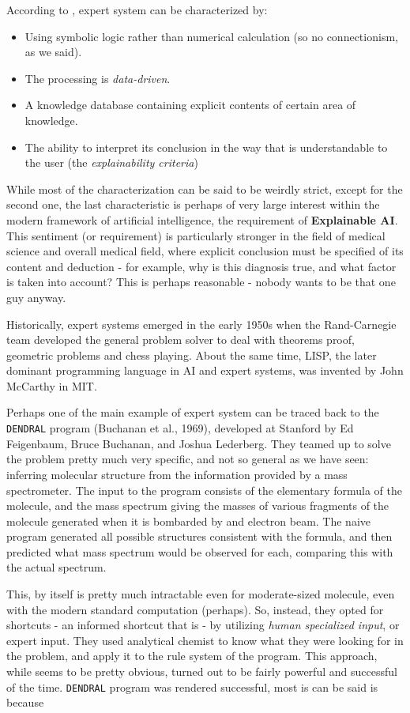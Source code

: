 According to \cite{articleMetaxiotis}, expert system can be characterized by: 
\begin{itemize}[itemsep=1pt,topsep=1pt]
    \item Using symbolic logic rather than numerical calculation (so no connectionism, as we said). 
    \item The processing is \textit{data-driven}. 
    \item A knowledge database containing explicit contents of certain area of knowledge. 
    \item The ability to interpret its conclusion in the way that is understandable to the user (the \textit{explainability criteria})
\end{itemize}
While most of the characterization can be said to be weirdly strict, except for the second one, the last characteristic is perhaps of very large interest within the modern framework of artificial intelligence, the requirement of \textbf{Explainable AI}. This sentiment (or requirement) is particularly stronger in the field of medical science and overall medical field, where explicit conclusion must be specified of its content and deduction - for example, why is this diagnosis true, and what factor is taken into account? This is perhaps reasonable - nobody wants to be that one guy anyway. 

Historically, expert systems emerged in the early 1950s when the Rand-Carnegie team developed the general problem solver to deal with theorems proof, geometric problems and chess playing. About the same time, LISP, the later dominant programming language in AI and expert systems, was invented by John McCarthy in MIT. 

Perhaps one of the main example of expert system can be traced back to the \texttt{DENDRAL} program (Buchanan et al., 1969), developed at Stanford by Ed Feigenbaum, Bruce Buchanan, and Joshua Lederberg. They teamed up to solve the problem pretty much very specific, and not so general as we have seen: inferring molecular structure from the information provided by a mass spectrometer. The input to the program consists of the elementary formula of the molecule, and the mass spectrum giving the masses of various fragments of the molecule generated when it is bombarded by and electron beam. The naive program generated all possible structures consistent with the formula, and then predicted what mass spectrum would be observed for each, comparing this with the actual spectrum. 

This, by itself is pretty much intractable even for moderate-sized molecule, even with the modern standard computation (perhaps). So, instead, they opted for shortcuts - an informed shortcut that is - by utilizing \textit{human specialized input}, or expert input. They used analytical chemist to know what they were looking for in the problem, and apply it to the rule system of the program. This approach, while seems to be pretty obvious, turned out to be fairly powerful and successful of the time. \texttt{DENDRAL} program was rendered successful, most is can be said is because

